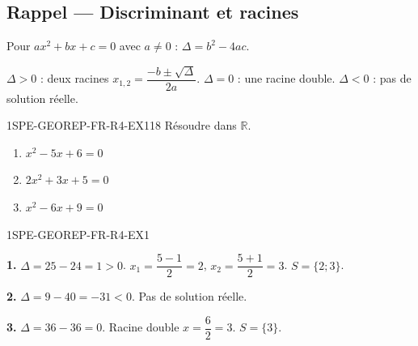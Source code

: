 

\subsection*{Rappel — Discriminant et racines}

Pour $ax^2 + bx + c = 0$ avec $a
\neq 0$ : $\Delta = b^2 - 4ac$.

$\Delta > 0$ : deux racines $x_{1,2} = \dfrac{-b \pm \sqrt{\Delta}}{2a}$. \quad $\Delta = 0$ : une racine double. \quad $\Delta < 0$ : pas de solution réelle.

\begin{exercice}{1SPE-GEOREP-FR-R4-EX1}{1}{8}
Résoudre dans $\mathbb{R}$.
\begin{enumerate}
  \item $x^2 - 5x + 6 = 0$
  \item $2x^2 + 3x + 5 = 0$
  \item $x^2 - 6x + 9 = 0$
\end{enumerate}
\end{exercice}


\begin{corrige}{1SPE-GEOREP-FR-R4-EX1}

\textbf{1.} $\Delta = 25 - 24 = 1 > 0$. $x_1 = \dfrac{5 - 1}{2} = 2$, $x_2 = \dfrac{5 + 1}{2} = 3$. $S = \{2 ; 3\}$.

\textbf{2.} $\Delta = 9 - 40 = -31 < 0$. Pas de solution réelle.

\textbf{3.} $\Delta = 36 - 36 = 0$. Racine double $x = \dfrac{6}{2} = 3$. $S = \{3\}$.

\end{corrige}

